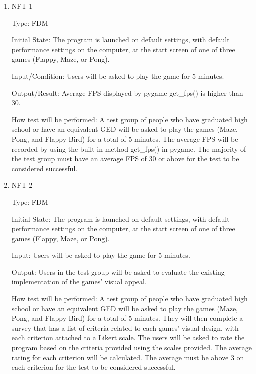 \documentclass[12pt, titlepage]{article}
\begin{document}
\begin{enumerate}

\item{NFT-1\\}

Type: FDM
					
Initial State: The program is launched on default settings, with default performance settings on the computer, at the start screen of one of three games (Flappy, Maze, or Pong).
					
Input/Condition: Users will be asked to play the game for 5 minutes.
					
Output/Result: Average FPS displayed by pygame get\_fps() is higher than 30.
					
How test will be performed: A test group of people who have graduated high school or have an equivalent GED will be asked to play the games (Maze, Pong, and Flappy Bird) for a total of 5 minutes. The average FPS will be recorded by using the built-in method get\_fps() in pygame. The majority of the test group must have an average FPS of 30 or above for the test to be considered successful.
					
\item{NFT-2\\}

Type: FDM
					
Initial State: The program is launched on default settings, with default performance settings on the computer, at the start screen of one of three games (Flappy, Maze, or Pong).
					
Input: Users will be asked to play the game for 5 minutes.
					
Output: Users in the test group will be asked to evaluate the existing implementation of the games' visual appeal.
					
How test will be performed: A test group of people who have graduated high school or have an equivalent GED will be asked to play the games (Maze, Pong, and Flappy Bird) for a total of 5 minutes. They will then complete a survey that has a list of criteria related to each games' visual design, with each criterion attached to a Likert scale. The users will be asked to rate the program based on the criteria provided using the scales provided.  The average rating for each criterion will be calculated. The average must be above 3 on each criterion for the test to be considered successful. 

					

\end{enumerate}
\end{document}
